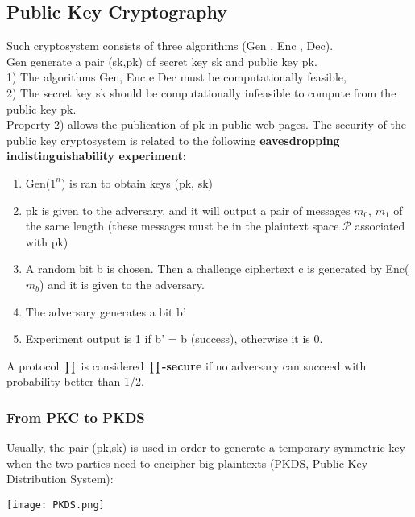 \documentclass{article}
\begin{document}
\subsection{Public Key Cryptography}
Such cryptosystem consists of three algorithms
(Gen , Enc , Dec).\\
Gen generate a pair (sk,pk) of secret key sk and public key pk.\\
1) The algorithms Gen, Enc e Dec must be computationally feasible,\\
2) The secret key sk should be computationally infeasible to compute from the public key pk.\\
Property 2) allows the publication of pk in public web pages.
The security of the public key cryptosystem is related to the following \textbf{eavesdropping indistinguishability experiment}:
\begin{enumerate}
    \item Gen($1^n$) is ran to obtain keys (pk, sk)
    \item pk is given to the adversary, and it will output a pair of messages $m_0$, $m_1$ of the same length (these messages must be in the plaintext space $\mathcal{P}$ associated with pk)
    \item A random bit b is chosen. Then a challenge ciphertext c is generated by Enc($m_b$) and it is given to the adversary.
    \item The adversary generates a bit b'
    \item Experiment output is 1 if b' = b (success), otherwise it is 0.
\end{enumerate}
A protocol $\prod$ is considered \textbf{$\prod$-secure} if no adversary can succeed with probability better than 1/2.\\

\subsubsection{From PKC to PKDS}
Usually, the pair (pk,sk) is used in order to generate a temporary symmetric key when the two parties need to encipher big plaintexts (PKDS, Public Key Distribution System):

\begin{center}
\texttt{[image: PKDS.png]}
\end{center}
\end{document}
